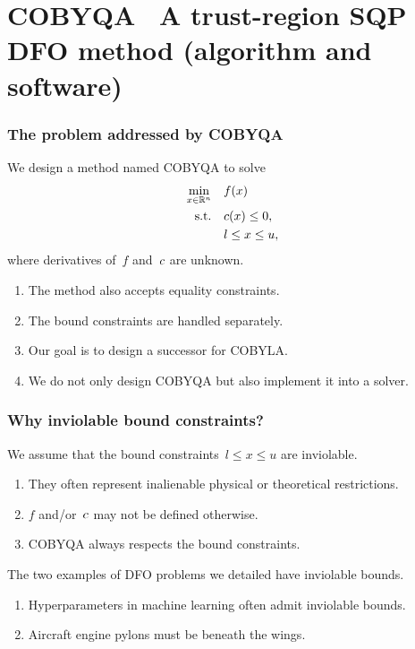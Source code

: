 \documentclass{polyu-presentation}
\newcommand{\con}[1][]{c\ifthenelse{\equal{#1}{}}{}{_{#1}}}
\newcommand{\obj}{f}
\newcommand{\xl}{l}
\newcommand{\xu}{u}
\begin{document}
\section{COBYQA \textemdash\ A trust-region SQP DFO method (\textbf{algorithm} and \textbf{software})}

\begin{frame}
    \frametitle{The problem addressed by COBYQA}
    
	We design a method named \alert{COBYQA} to solve
    \begin{align*}
        \min_{x \in \R^n}   & \quad \obj(x)\\
        \text{s.t.}         & \quad \con(x) \le 0,\\
                            & \quad \xl \le x \le \xu,
    \end{align*}
    where derivatives of~$\obj$ and~$\con$ are \alert{unknown}.

    \bigskip

    \begin{block}{}
        \begin{enumerate}
            \item The method also accepts \alert{equality constraints}.
            \item The bound constraints are handled separately.
            \item Our goal is to design a \alert{successor} for COBYLA.
            \item We do not only design COBYQA but also \alert{implement} it into a solver.
        \end{enumerate}
    \end{block}
\end{frame}

\begin{frame}
    \frametitle{Why inviolable bound constraints?}
    
	\begin{block}{}
        We assume that the bound constraints~$\xl \le x \le \xu$ are \alert{inviolable}.
        \begin{enumerate}
            \item They often represent inalienable \alert{physical} or \alert{theoretical} restrictions.
            \item $f$ and/or~$\con$ may \alert{not} be defined otherwise.
            \item COBYQA \alert{always} respects the bound constraints.
        \end{enumerate}
    \end{block}

    \bigskip

    The two examples of DFO problems we detailed have inviolable bounds.
    \begin{enumerate}
        \item Hyperparameters in machine learning often admit inviolable bounds.
        \item Aircraft engine pylons must be beneath the wings.
    \end{enumerate}
\end{frame}
\end{document}

